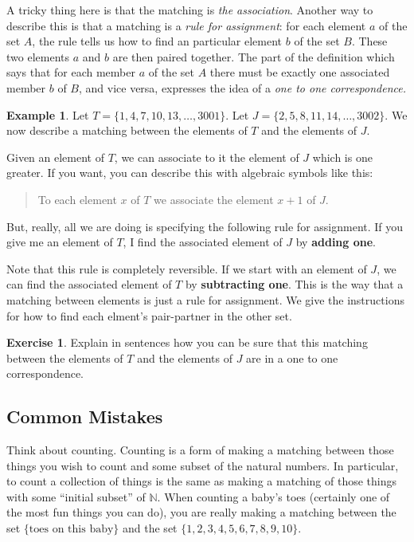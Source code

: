 \documentclass[12pt,letterpaper]{article}
\theoremstyle{definition}
\newtheorem{example}{Example}
\newtheorem{exercise}[question]{Exercise}
\begin{document}
A tricky thing here is that the matching is \emph{the association}.
Another way to describe this is that a matching is a \emph{rule for assignment}: for each element $a$ of the set $A$, the rule tells us how to find an particular element $b$ of the set $B$.
These two elements $a$ and $b$ are then paired together.
The part of the definition which says that for each member $a$ of the set $A$ there must be exactly one associated member $b$ of $B$, and vice versa, expresses the idea of a \emph{one to one correspondence.}

\begin{example}
Let $T = \{ 1, 4, 7, 10, 13, \ldots, 3001\}$.
Let $J = \{ 2, 5, 8, 11, 14, \ldots, 3002\}$.
We now describe a matching between the elements of $T$ and the elements of $J$.

Given an element of $T$, we can associate to it the element of $J$ which is one greater. 
If you want, you can describe this with algebraic symbols like this: 
\begin{quote}
To each element $x$ of $T$ we associate the element $x+1$ of $J$.
\end{quote}
But, really, all we are doing is specifying the following rule for assignment. If you give me an element of $T$, I find the associated element of $J$ by \textbf{adding one}.

Note that this rule is completely reversible.
If we start with an element of $J$, we can find the associated element of $T$ by \textbf{subtracting one}.
This is the way that a matching between elements is just a rule for assignment.
We give the instructions for how to find each elment's pair-partner in the other set.
\end{example}


\begin{exercise}
Explain in sentences how you can be sure that this matching between the elements of $T$ and the elements of $J$ are in a one to one correspondence.
\end{exercise}

\subsection*{Common Mistakes}

Think about counting. 
Counting is a form of making a matching between those things you wish to count and some subset of the natural numbers.
In particular, to count a collection of things is the same as making a matching of those things with some ``initial subset'' of $\mathbb{N}$. 
When counting a baby's toes (certainly one of the most fun things you can do), you are really making a matching between the set $\{ \text{toes on this baby} \}$ and the set $\{1, 2, 3, 4, 5, 6, 7, 8, 9, 10\}$.
\end{document}
